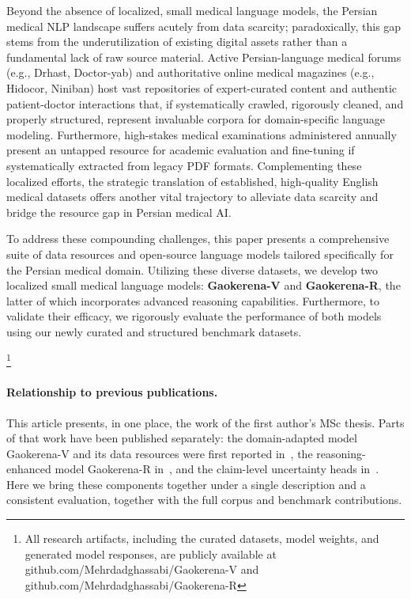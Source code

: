 \documentclass[review]{elsarticle}
\begin{document}
Beyond the absence of localized, small medical language models, the Persian medical NLP landscape suffers acutely from data scarcity; paradoxically, this gap stems from the underutilization of existing digital assets rather than a fundamental lack of raw source material. Active Persian-language medical forums (e.g., Drhast, Doctor-yab) and authoritative online medical magazines (e.g., Hidocor, Niniban) host vast repositories of expert-curated content and authentic patient-doctor interactions that, if systematically crawled, rigorously cleaned, and properly structured, represent invaluable corpora for domain-specific language modeling. Furthermore, high-stakes medical examinations administered annually present an untapped resource for academic evaluation and fine-tuning if systematically extracted from legacy PDF formats. Complementing these localized efforts, the strategic translation of established, high-quality English medical datasets offers another vital trajectory to alleviate data scarcity and bridge the resource gap in Persian medical AI.

To address these compounding challenges, this paper presents a comprehensive suite of data resources and open-source language models tailored specifically for the Persian medical domain. Utilizing these diverse datasets, we develop two localized small medical language models: \textbf{Gaokerena-V} and \textbf{Gaokerena-R}, the latter of which incorporates advanced reasoning capabilities. Furthermore, to validate their efficacy, we rigorously evaluate the performance of both models using our newly curated and structured benchmark datasets.

\footnote{All research artifacts, including the curated datasets, model weights, and generated model responses, are publicly available at github.com/Mehrdadghassabi/Gaokerena-V and github.com/Mehrdadghassabi/Gaokerena-R}

\paragraph{Relationship to previous publications.} This article presents, in one place, the work of the first author's MSc thesis. Parts of that work have been published separately: the domain-adapted model Gaokerena-V and its data resources were first reported in~\cite{b1}, the reasoning-enhanced model Gaokerena-R in~\cite{b2}, and the claim-level uncertainty heads in~\cite{b40}. Here we bring these components together under a single description and a consistent evaluation, together with the full corpus and benchmark contributions.
\end{document}

